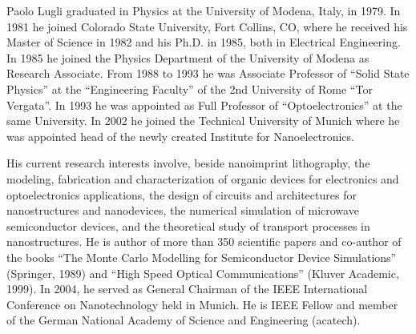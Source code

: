 \documentclass[journal]{IEEEtran}
\begin{document}
\begin{IEEEbiography}
{Paolo Lugli} graduated in Physics at the University of Modena, Italy, in 1979. In 1981 he joined Colorado State University, Fort Collins, CO, where he received his Master of Science in 1982 and his Ph.D. in 1985, both in Electrical Engineering. In 1985 he joined the Physics Department of the University of Modena as Research Associate. From 1988 to 1993 he was Associate Professor of ``Solid State Physics'' at the ``Engineering Faculty'' of the 2nd University of Rome ``Tor Vergata''. In 1993 he was appointed as Full Professor of ``Optoelectronics'' at the same University. In 2002 he joined the Technical University of Munich where he was appointed head of the newly created Institute for Nanoelectronics.

His current research interests involve, beside nanoimprint lithography, the modeling, fabrication and characterization of organic devices for electronics and optoelectronics applications, the design of circuits and architectures for nanostructures and nanodevices, the numerical simulation of microwave semiconductor devices, and the theoretical study of transport processes in nanostructures. 
He is author of more than 350 scientific papers and co-author of the books ``The Monte Carlo Modelling for Semiconductor Device Simulations'' (Springer, 1989) and ``High Speed Optical Communications'' (Kluver Academic, 1999). In 2004, he served as General Chairman of the IEEE International Conference on Nanotechnology held in Munich. He is IEEE Fellow and member of the German National Academy of Science and Engineering (acatech).
\end{IEEEbiography}
%
%
\end{document}
